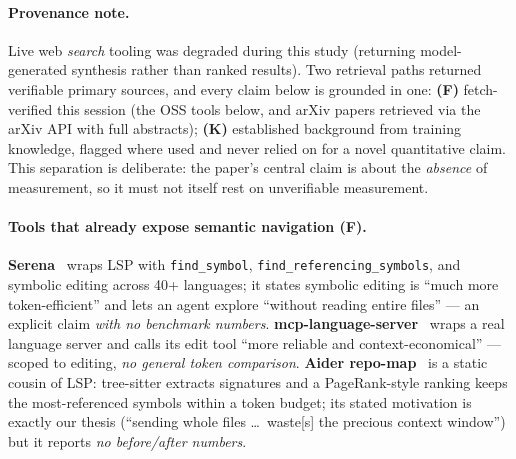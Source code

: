\documentclass[11pt]{article}
\newcommand{\code}[1]{\texttt{#1}}
\begin{document}
\paragraph{Provenance note.} Live web \emph{search} tooling was degraded during this study (returning
model-generated synthesis rather than ranked results). Two retrieval paths returned verifiable primary
sources, and every claim below is grounded in one: \textbf{(F)} fetch-verified this session (the OSS
tools below, and arXiv papers retrieved via the arXiv API with full abstracts); \textbf{(K)} established
background from training knowledge, flagged where used and never relied on for a novel quantitative
claim. This separation is deliberate: the paper's central claim is about the \emph{absence} of
measurement, so it must not itself rest on unverifiable measurement.

\paragraph{Tools that already expose semantic navigation (F).}
\textbf{Serena}~\cite{serena} wraps LSP with \code{find\_symbol},
\code{find\_referencing\_symbols}, and symbolic editing across 40+ languages; it states symbolic editing
is ``much more token-efficient'' and lets an agent explore ``without reading entire files'' --- an
explicit claim \emph{with no benchmark numbers}. \textbf{mcp-language-server}~\cite{mcpls} wraps a real language server and calls its edit
tool ``more reliable and context-economical'' --- scoped to editing, \emph{no general token comparison}.
\textbf{Aider repo-map}~\cite{aidermap} is a static cousin of LSP:
tree-sitter extracts signatures and a PageRank-style ranking keeps the most-referenced symbols within a
token budget; its stated motivation is exactly our thesis (``sending whole files \dots\ waste[s] the
precious context window'') but it reports \emph{no before/after numbers}.
\end{document}
